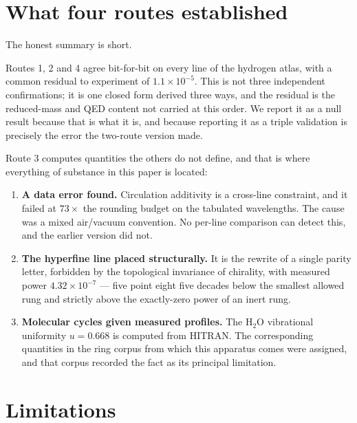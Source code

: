 \documentclass[11pt,a4paper]{article}
\theoremstyle{stmtstyle}
\theoremstyle{definition}
\theoremstyle{remark}
\newcommand{\unif}{u}
\begin{document}
\section{What four routes established}
\label{sec:established}

The honest summary is short.

Routes 1, 2 and 4 agree bit-for-bit on every line of the hydrogen atlas,
with a common residual to experiment of $1.1\times10^{-5}$. This is not
three independent confirmations; it is one closed form derived three ways,
and the residual is the reduced-mass and QED content not carried at this
order. We report it as a null result because that is what it is, and
because reporting it as a triple validation is precisely the error the
two-route version made.

Route 3 computes quantities the others do not define, and that is where
everything of substance in this paper is located:

\begin{enumerate}[label=(\roman*),nosep]
\item \textbf{A data error found.} Circulation additivity is a cross-line
constraint, and it failed at $73\times$ the rounding budget on the
tabulated wavelengths. The cause was a mixed air/vacuum convention. No
per-line comparison can detect this, and the earlier version did not.
\item \textbf{The hyperfine line placed structurally.} It is the rewrite of
a single parity letter, forbidden by the topological invariance of
chirality, with measured power $4.32\times10^{-7}$ --- five point eight five
decades below the smallest allowed rung and strictly above the exactly-zero
power of an inert rung.
\item \textbf{Molecular cycles given measured profiles.} The H$_2$O
vibrational uniformity $\unif=0.668$ is computed from HITRAN. The
corresponding quantities in the ring corpus from which this apparatus comes
were assigned, and that corpus recorded the fact as its principal
limitation.
\end{enumerate}

\section{Limitations}
\label{sec:limits}
\end{document}
